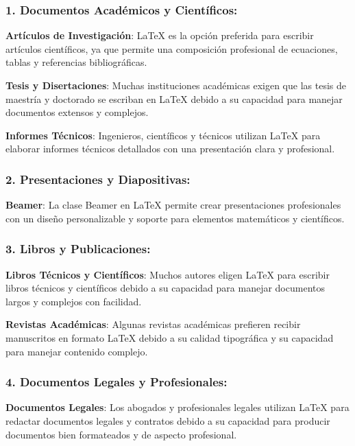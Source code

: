 \documentclass{article}
\begin{document}
 \subsubsection{1. Documentos Académicos y Científicos:}
 
\textbf{Artículos de Investigación}: LaTeX es la opción preferida para escribir artículos científicos, ya que permite una composición profesional de ecuaciones, tablas y referencias bibliográficas.

\textbf{Tesis y Disertaciones}: Muchas instituciones académicas exigen que las tesis de maestría y doctorado se escriban en LaTeX debido a su capacidad para manejar documentos extensos y complejos.

\textbf{Informes Técnicos}: Ingenieros, científicos y técnicos utilizan LaTeX para elaborar informes técnicos detallados con una presentación clara y profesional.



 \subsubsection{2. Presentaciones y Diapositivas:}
 
\textbf{Beamer}: La clase Beamer en LaTeX permite crear presentaciones profesionales con un diseño personalizable y soporte para elementos matemáticos y científicos.



 \subsubsection{3. Libros y Publicaciones:}
 
\textbf{Libros Técnicos y Científicos}: Muchos autores eligen LaTeX para escribir libros técnicos y científicos debido a su capacidad para manejar documentos largos y complejos con facilidad.

\textbf{Revistas Académicas}: Algunas revistas académicas prefieren recibir manuscritos en formato LaTeX debido a su calidad tipográfica y su capacidad para manejar contenido complejo.



 \subsubsection{4. Documentos Legales y Profesionales:}
 
\textbf{Documentos Legales}: Los abogados y profesionales legales utilizan LaTeX para redactar documentos legales y contratos debido a su capacidad para producir documentos bien formateados y de aspecto profesional.
\end{document}
